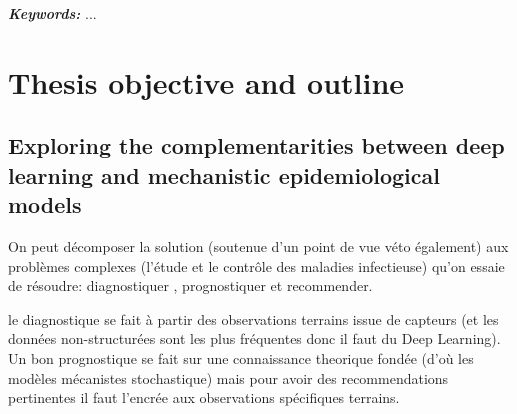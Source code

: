 

\textit{\textbf{Keywords:}} ...



\clearpage 

\section{Thesis objective and outline}

\subsection{Exploring the complementarities between deep learning and mechanistic epidemiological models}





On peut décomposer la solution (soutenue d'un point de vue véto également) aux problèmes complexes (l'étude et le contrôle des maladies infectieuse) qu'on essaie de résoudre: diagnostiquer , prognostiquer et recommender.

le diagnostique se fait à partir des observations terrains issue de capteurs (et les données non-structurées sont les plus fréquentes donc il faut du Deep Learning). Un bon prognostique se fait sur une connaissance theorique fondée (d'où les modèles mécanistes stochastique) mais pour avoir des recommendations pertinentes il faut l'encrée aux observations spécifiques terrains. 

